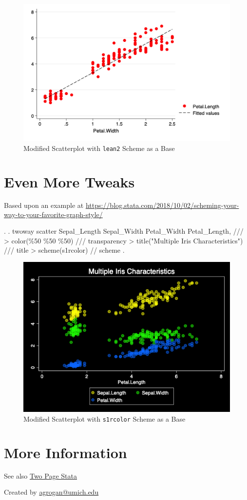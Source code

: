 \documentclass[]{article}
\begin{document}
\begin{stlog}


{\smallskip}

\end{stlog}

\begin{figure}
\centering
\includegraphics[width=0.75\linewidth]{lean2Ascatter.png}
\caption{Modified Scatterplot with \texttt{lean2} Scheme as a Base}
\end{figure}

\hypertarget{even-more-tweaks}{%
\section{Even More Tweaks}\label{even-more-tweaks}}

Based upon an example at
\url{https://blog.stata.com/2018/10/02/scheming-your-way-to-your-favorite-graph-style/}

\begin{stlog}
. 
. twoway scatter Sepal_Length Sepal_Width Petal_Width Petal_Length, /// 
> color(\%50 \%50 \%50) /// transparency 
> title("Multiple Iris Characteristics") /// title
> scheme(s1rcolor) // scheme
{\smallskip}
. 
\end{stlog}

\begin{stlog}


{\smallskip}

\end{stlog}

\begin{figure}
\centering
\includegraphics[width=0.75\linewidth]{s1rcolorAscatter.png}
\caption{Modified Scatterplot with \texttt{s1rcolor} Scheme as a Base}
\end{figure}

\hypertarget{more-information}{%
\section{More Information}\label{more-information}}

See also
\href{https://agrogan1.github.io/Stata/two-page-stata/TwoPageStata.pdf}{Two
Page Stata}

Created by \url{agrogan@umich.edu}
\end{document}
